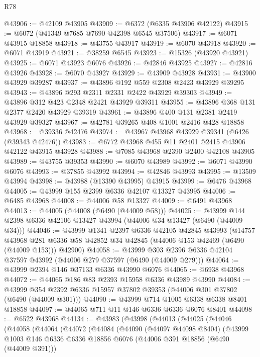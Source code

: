 \begin{lexlean}{R78}
\begin{coremodule}
@43906 := @42109 @43905
@43909 := @6372 (@6335 @43906 @42122)
@43915 := @6072 (@41349 @7685 @7690 @42398 @6545 @37506)
@43917 := @6071 @43915 @18858
@43918 := @43755 @43917
@43919 := @6070 @43918
@43920 := @6071 @43919
@43921 := @38259 @6545
@43923 := @15326 (@43920 @43921)
@43925 := @6071 @43923 @6076
@43926 := @42846 @43925
@43927 := @42816 @43926
@43928 := @6070 @43927
@43929 := @43909 @43928
@43931 := @43900 @43929 @39287
@43937 := @43896 @192 @559 @2308 @2423 @43929 @39295
@43943 := @43896 @293 @2311 @2331 @2422 @43929 @39303
@43949 := @43896 @312 @423 @2348 @2421 @43929 @39311
@43955 := @43896 @368 @131 @2377 @2420 @43929 @39319
@43961 := @43896 @400 @131 @2381 @2419 @43929 @39327
@43967 := @42781 @39265 @408 @1001 @2416 @428 @18858
@43968 := @39336 @42476
@43974 := @43967 @43968 @43929 @39341 (@6426 (@39343 @42476))
@43983 := @6772 @43968 @455 @11 @2401 @2415 @43906 @42122 @43915 @43928
@43988 := @7085 @43968 @2390 @2400 @42108 @43905
@43989 := @43755 @39353
@43990 := @6070 @43989
@43992 := @6071 @43990 @6076
@43993 := @37855 @43992
@43994 := @42846 @43993
@43995 := @13509 @43994
@43998 := @43988 (@13390 @43995) @43915
@43999 := @6476 @43968
@44005 := @43999 @155 @2399 @6336 @42107 @13327 @43995
@44006 := @6485 @43968
@44008 := @44006 @58 @13327
@44009 := @6491 @43968
@44013 := @44005 (@44008 (@6490 (@44009 @58)))
@44025 := @43999 @144 @2398 @6336 @42106 @13427 @43994 (@44006 @34 @13427 (@6490 (@44009 @34)))
@44046 := @43999
    @1341
    @2397
    @6336
    @42105
    @42845
    @43993
    (@14757
      @43968
      @281
      @6336
      @58
      @42852
      @34
      @42845
      (@44006 @153 @42469 (@6490 (@44009 @153)))
      @42900)
@44058 := @43999 @303 @2396 @6336 @42104 @37597 @43992 (@44006 @279 @37597 (@6490 (@44009 @279)))
@44064 := @43999 @2394 @146 @37133 @6336 @43990 @6076
@44065 := @6938 @43968
@44072 := @44065 @186 @83 @2393 @15958 @6336 @43989 @43990
@44084 := @43999 @354 @2392 @6336 @15957 @37802 @39353 (@44006 @301 @37802 (@6490 (@44009 @301)))
@44090 := @43999 @714 @1005 @6338 @6338 @8401 @18858
@44097 := @44065 @711 @11 @146 @6336 @6336 @6076 @8401
@44098 := @6522 @43968
@44134 := @43983
    (@43998
      (@44013
        (@44025
          (@44046
            (@44058
              (@44064
                (@44072
                  (@44084
                    (@44090
                      (@44097 @44098 @8404)
                      (@43999
                        @1003
                        @146
                        @6336
                        @6336
                        @18856
                        @6076
                        (@44006 @391 @18856 (@6490 (@44009 @391)))

\end{coremodule}
\end{lexlean}

